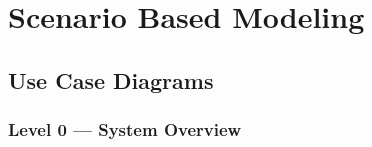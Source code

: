 \documentclass[12pt,a4paper]{article}
\begin{document}
\newpage
\section{Scenario Based Modeling}

\subsection{Use Case Diagrams}

\subsubsection{Level 0 --- System Overview}
\end{document}
